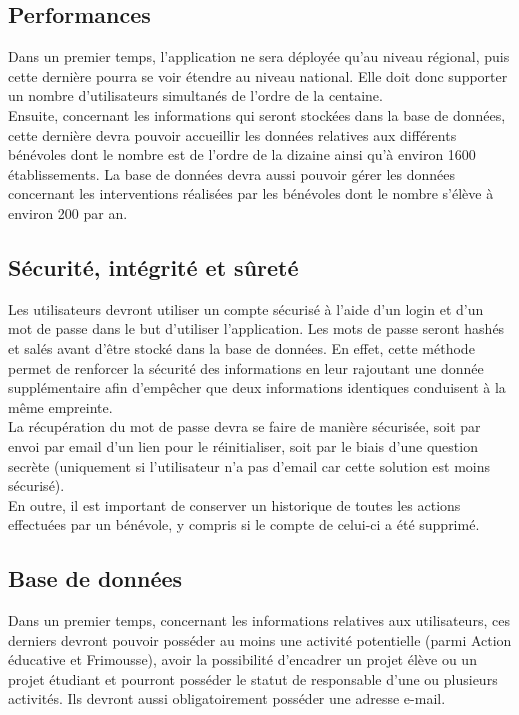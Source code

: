 \subsection{Performances}

Dans un premier temps, l'application ne sera déployée qu'au niveau régional, puis cette dernière pourra se voir étendre au niveau national. Elle doit donc supporter un nombre d'utilisateurs simultanés de l'ordre de la centaine. \\

Ensuite, concernant les informations qui seront stockées dans la base de données, cette dernière devra pouvoir accueillir les données relatives aux différents bénévoles dont le nombre est de l'ordre de la dizaine ainsi qu'à environ 1600 établissements. La base de données devra aussi pouvoir gérer les données concernant les interventions réalisées par les bénévoles dont le nombre s'élève à environ 200 par an.

\subsection{Sécurité, intégrité et sûreté}

Les utilisateurs devront utiliser un compte sécurisé à l'aide d'un login et d'un mot de passe dans le but d'utiliser l'application. Les mots de passe seront hashés et salés avant d'être stocké dans la base de données. En effet, cette méthode permet de renforcer la sécurité des informations en leur rajoutant une donnée supplémentaire afin d'empêcher que deux informations identiques conduisent à la même empreinte. \\

 La récupération du mot de passe devra se faire de manière sécurisée, soit par envoi par email d'un lien pour le réinitialiser, soit par le biais d'une question secrète (uniquement si l'utilisateur n'a pas d'email car cette solution est moins sécurisé).\\

En outre, il est important de conserver un historique de toutes les actions effectuées par un bénévole, y compris si le compte de celui-ci a été supprimé. 

\subsection{Base de données}

Dans un premier temps, concernant les informations relatives aux utilisateurs, ces derniers devront pouvoir posséder au moins une activité potentielle (parmi Action éducative et Frimousse), avoir la possibilité d'encadrer un projet élève ou un projet étudiant et pourront posséder le statut de responsable d'une ou plusieurs activités. Ils devront aussi obligatoirement posséder une adresse e-mail. \\

